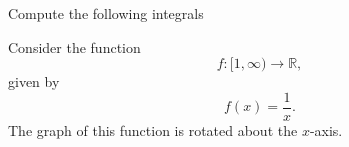 \documentclass[11pt]{exam}
\newcommand{\func}[3]{{#1} : {#2} \longrightarrow {#3}}
\begin{document}
%
%
%

\begin{questions}



\addpoints
\question Compute the following integrals

\newpage
\addpoints
\question Consider the function 
\begin{equation*}
\func{f}{[1,\infty)}{\mathbb{R}},
\end{equation*}
given by 
\begin{equation*}
f(x)=\frac{1}{x}.
\end{equation*}
The graph of this function is rotated about the $x$-axis. 
\begin{parts}

\end{parts}
\end{questions}
\end{document}
